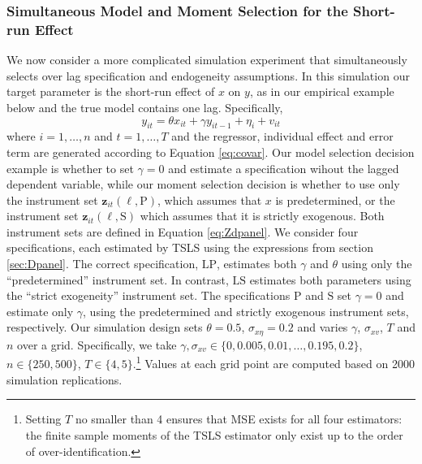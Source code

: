 \subsubsection{Simultaneous Model and Moment Selection for the Short-run Effect}
\label{sec:Dpanel_sim_SR}
We now consider a more complicated simulation experiment that simultaneously selects over lag specification and endogeneity assumptions. 
In this simulation our target parameter is the short-run effect of $x$ on $y$, as in our empirical example below and the true model contains one lag.
Specifically, 
\[
  y_{it} = \theta x_{it} + \gamma y_{it-1}  + \eta_i + v_{it}
\]
where $i = 1, \dots, n$ and $t = 1, \dots, T$ and the regressor, individual effect and error term are generated according to Equation \ref{eq:covar}.
Our model selection decision example is whether to set $\gamma = 0$ and estimate a specification wihout the lagged dependent variable, while our moment selection decision is whether to use only the instrument set $\mathbf{z}_{it}(\ell,\text{P})$, 
which assumes that $x$ is predetermined, or the instrument set $\mathbf{z}_{it}(\ell,\text{S})$ which assumes that it is strictly exogenous.
Both instrument sets are defined in Equation \ref{eq:Zdpanel}.
We consider four specifications, each estimated by TSLS using the expressions from section \ref{sec:Dpanel}.
The correct specification, $\text{LP}$, estimates both $\gamma$ and $\theta$ using only the ``predetermined'' instrument set.
In contrast, $\text{LS}$ estimates both parameters using the ``strict exogeneity'' instrument set.
The specifications $\text{P}$ and $\text{S}$ set $\gamma=0$ and estimate only $\gamma$, using the predetermined and strictly exogenous instrument sets, respectively.
Our simulation design sets $\theta = 0.5$, $\sigma_{x\eta}=0.2$ and varies  $\gamma$, $\sigma_{xv}$, $T$ and $n$ over a grid.
Specifically, we take $\gamma, \sigma_{xv} \in \{0, 0.005, 0.01, \hdots, 0.195, 0.2\}$, $n \in \{250,500\}$, $T \in \{4,5\}$.\footnote{Setting $T$ no smaller than 4 ensures that MSE exists for all four estimators: the finite sample moments of the TSLS estimator only exist up to the order of over-identification.}
Values at each grid point are computed based on 2000 simulation replications.

